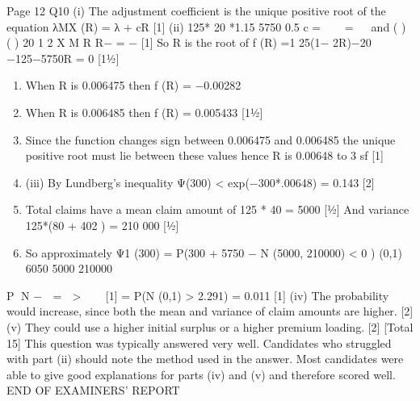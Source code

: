 \documentclass[a4paper,12pt]{article}
\begin{document}

Page 12
Q10 (i) The adjustment coefficient is the unique positive root of the equation
λMX (R) = λ + cR [1]
(ii) 125* 20 *1.15 5750
0.5
c =   =
   
and
( ) ( ) 20 1 2 X M R R− = − [1]
So R is the root of
f (R) =1 25(1− 2R)−20 −125−5750R = 0 [1½]
\begin{enumerate}
\item When R is 0.006475 then f (R) = −0.00282
\item When R is 0.006485 then f (R) = 0.005433 [1½]
\item Since the function changes sign between 0.006475 and 0.006485 the unique
positive root must lie between these values hence R is 0.00648 to 3 sf [1]
\item (iii) By Lundberg’s inequality Ψ(300) < exp(−300*.00648) = 0.143 [2]
\item Total claims have a mean claim amount of 125 * 40 = 5000 [½]
And variance 125*(80 + 402 ) = 210 000 [½]
\item So approximately
Ψ1 (300) = P(300 + 5750 − N (5000, 210000) < 0 )
(0,1) 6050 5000
210000
\end{enumerate}
P N −  =  > 
 
[1]
= P(N (0,1) > 2.291) = 0.011 [1]
(iv) The probability would increase, since both the mean and variance of claim
amounts are higher. [2]
(v) They could use a higher initial surplus or a higher premium loading. [2]
[Total 15]
This question was typically answered very well. Candidates who struggled
with part (ii) should note the method used in the answer. Most candidates
were able to give good explanations for parts (iv) and (v) and therefore scored
well.
END OF EXAMINERS’ REPORT
\end{document}
